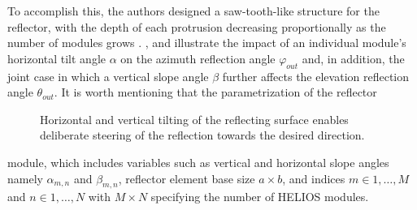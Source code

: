 To accomplish this, the authors designed a saw-tooth-like structure for the reflector, with the depth of each protrusion decreasing proportionally as the number of modules grows \cite{Helios}. , and  illustrate the impact of an individual module's horizontal tilt angle $\alpha$ on the azimuth reflection angle $\varphi_{out}$ and, in addition, the joint case in which a vertical slope angle $\beta$ further affects the elevation reflection angle $\theta_{out}$. It is worth mentioning that the parametrization of the reflector
\begin{figure}[H]
	\centering
	\hfill
	\hfill
	\caption[Horizontal and vertical tilting of the reflecting surface enables deliberate steering of the reflection towards the desired direction.]{Horizontal and vertical tilting of the reflecting surface enables deliberate steering of the reflection towards the desired direction. }
	\label{fig:tricdvsuq}
\end{figure}
module, which includes variables such as vertical and horizontal slope angles namely $\alpha_{m,n}$ and $\beta_{m,n}$, reflector element base size $a \times b$, and indices $m \in 1, \dots, M$ and $n \in 1, \dots, N$ with $M \times N$ specifying the number of HELIOS modules.
